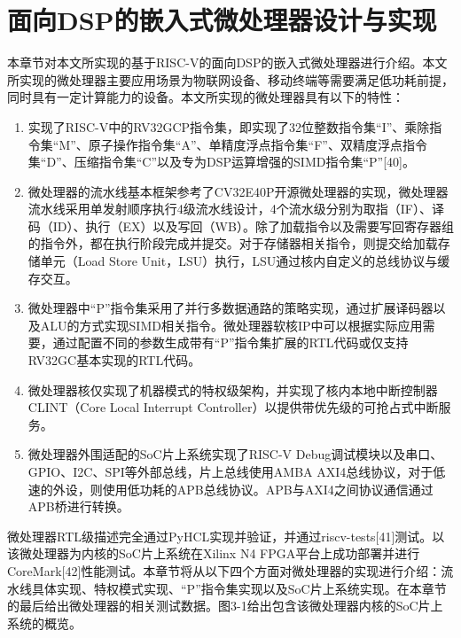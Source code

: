 \chapter{面向DSP的嵌入式微处理器设计与实现}

本章节对本文所实现的基于RISC-V的面向DSP的嵌入式微处理器进行介绍。本文所实现的微处理器主要应用场景为物联网设备、移动终端等需要满足低功耗前提，同时具有一定计算能力的设备。本文所实现的微处理器具有以下的特性：

\begin{enumerate}
	\item 实现了RISC-V中的RV32GCP指令集，即实现了32位整数指令集“I”、乘除指令集“M”、原子操作指令集“A”、单精度浮点指令集“F”、双精度浮点指令集“D”、压缩指令集“C”以及专为DSP运算增强的SIMD指令集“P”[40]。
	\item 微处理器的流水线基本框架参考了CV32E40P开源微处理器的实现，微处理器流水线采用单发射顺序执行4级流水线设计，4个流水级分别为取指（IF）、译码（ID）、执行（EX）以及写回（WB）。除了加载指令以及需要写回寄存器组的指令外，都在执行阶段完成并提交。对于存储器相关指令，则提交给加载存储单元（Load Store Unit，LSU）执行，LSU通过核内自定义的总线协议与缓存交互。
	\item 微处理器中“P”指令集采用了并行多数据通路的策略实现，通过扩展译码器以及ALU的方式实现SIMD相关指令。微处理器软核IP中可以根据实际应用需要，通过配置不同的参数生成带有“P”指令集扩展的RTL代码或仅支持RV32GC基本实现的RTL代码。
	\item 微处理器核仅实现了机器模式的特权级架构，并实现了核内本地中断控制器CLINT（Core Local Interrupt Controller）以提供带优先级的可抢占式中断服务。
	\item 微处理器外围适配的SoC片上系统实现了RISC-V Debug调试模块以及串口、GPIO、I2C、SPI等外部总线，片上总线使用AMBA AXI4总线协议，对于低速的外设，则使用低功耗的APB总线协议。APB与AXI4之间协议通信通过APB桥进行转换。
\end{enumerate}

微处理器RTL级描述完全通过PyHCL实现并验证，并通过riscv-tests[41]测试。以该微处理器为内核的SoC片上系统在Xilinx N4 FPGA平台上成功部署并进行CoreMark[42]性能测试。本章节将从以下四个方面对微处理器的实现进行介绍：流水线具体实现、特权模式实现、“P”指令集实现以及SoC片上系统实现。在本章节的最后给出微处理器的相关测试数据。图3-1给出包含该微处理器内核的SoC片上系统的概览。

